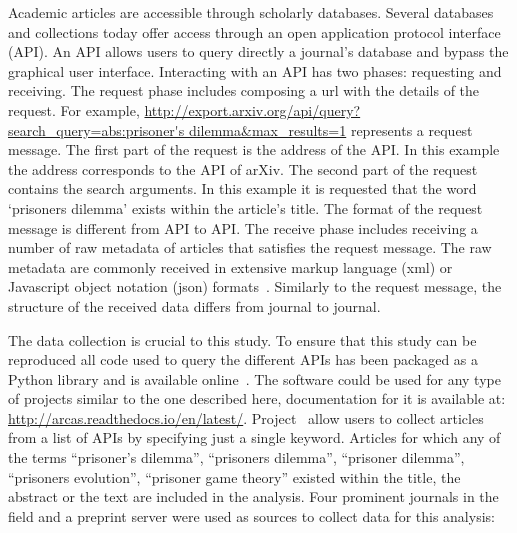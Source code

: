 Academic articles are accessible through scholarly databases. Several databases
and collections today offer access through an open application protocol
interface (API). An API allows users to query directly a journal's database and
bypass the graphical user interface. Interacting with an API has two phases:
requesting and receiving. The request phase includes composing a url with the
details of the request. For example,
\url{http://export.arxiv.org/api/query?search_query=abs:prisoner's
dilemma&max_results=1} represents a request message. The first part of the
request is the address of the API. In this example the address corresponds to
the API of arXiv. The second part of the request contains the search arguments.
In this example it is requested that the word `prisoners dilemma' exists within
the article's title. The format of the request message is different from API to
API. The receive phase includes receiving a number of raw metadata of articles
that satisfies the request message. The raw metadata are commonly received in
extensive markup language (xml) or Javascript object notation (json)
formats~\cite{nurseitov2009}. Similarly to the request message, the structure of
the received data differs from journal
to journal.

The data collection is crucial to this study. To ensure that this study can be
reproduced all code used to query the different APIs has been packaged as a
Python library and is available online~\cite{nikoleta_2017}. The software could
be used for any type of projects similar to the one described here,
documentation for it is available at:
\url{http://arcas.readthedocs.io/en/latest/}. Project~\cite{nikoleta_2017} allow
users to collect articles from a list of APIs by specifying just a single
keyword. Articles for which any of the terms ``prisoner's dilemma'',
``prisoners dilemma'', ``prisoner dilemma'', ``prisoners evolution'', ``prisoner
game theory'' existed within the title, the abstract or the text are included
in the analysis. Four prominent journals in the field and a preprint server
were used as sources to collect data for this analysis:

